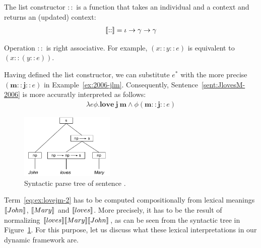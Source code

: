 \begin{notation} The list constructor $::$ is a function that takes an individual and a context and returns an (updated) context:
\begin{align} 
 [\![::]\!]  =  \iota \rightarrow \gamma \rightarrow \gamma
\end{align}
\end{notation}

\begin{remark}
Operation $::$ is right associative. For example, $(x::y::e)$ is equivalent to $(x::(y::e))$.
\end{remark}

Having defined the list constructor, we can substitute $e^*$ with the more precise $(\textbf{m} :: \textbf{j} ::{e})$ in Example~\ref{ex:2006-jlm}. Consequently, Sentence~\eqref{sent:JlovesM-2006} is more accuratly interpreted as follows:
\begin{align}
\lambda e \phi. \textbf{love}  \ \textbf{j} \ \textbf{m} \land \phi (\textbf{m} :: \textbf{j} ::{e}) \label{eq:ex:lovejm-2}
\end{align}

\begin{figure}[h!]
 \centering
    \includegraphics[width=0.4\textwidth]{images/JohnLovesMary.pdf}
\caption{Syntactic parse tree of sentence .} \label{fig:JohnLovesMary}
\end{figure}

Term~\eqref{eq:ex:lovejm-2} has to be computed compositionally from lexical meanings $[\![John]\!]$, $[\![Mary]\!]$ and $[\![loves]\!]$. More precisely, it has to be the result of normalizing  $[\![loves]\!] [\![Mary]\!] [\![John]\!]$, as can be seen from the syntactic tree in Figure~\ref{fig:JohnLovesMary}. For this purpose, let us discuss what these lexical interpretations in our dynamic framework are.

